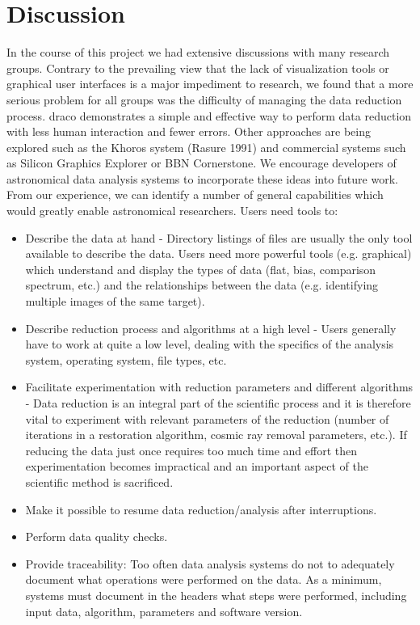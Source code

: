 \section{Discussion}

In the course of this project we had extensive discussions with many 
research groups. Contrary to the prevailing view that the lack of 
visualization tools or graphical user interfaces is a major impediment to 
research, we found that a more serious problem for all groups was the 
difficulty of managing the data reduction process. {\sc draco} demonstrates 
a simple and effective way to perform data reduction with less human 
interaction and fewer errors. Other approaches are being explored such as 
the Khoros system (Rasure 1991) and commercial systems such as Silicon 
Graphics Explorer or BBN Cornerstone. We encourage developers of 
astronomical data analysis systems to incorporate these ideas into 
future work. From our experience, we can identify a number of general 
capabilities which would greatly enable astronomical researchers. Users 
need tools to: 

\begin{itemize} 

\item Describe the data at hand - Directory listings of files are usually 
the only tool available to describe the data. Users need more powerful 
tools (e.g. graphical) which understand and display the types of data (flat, bias, comparison 
spectrum, etc.) and the relationships between the data (e.g. identifying 
multiple images of the same target).

\item Describe reduction process and algorithms at a high level - Users 
generally have to work at quite a low level, dealing with the specifics 
of the analysis system, operating system, file types, etc.

\item Facilitate experimentation with reduction parameters and different 
algorithms - Data reduction is an integral part of the scientific process 
and it is therefore vital to experiment with relevant parameters of the 
reduction (number of iterations in a restoration algorithm, cosmic ray 
removal parameters, etc.). If reducing the data just once requires too 
much time and effort then experimentation becomes impractical and an 
important aspect of the scientific method is sacrificed.

\item Make it possible to resume data reduction/analysis after 
interruptions.

\item Perform data quality checks.

\item Provide traceability: Too often data analysis systems do not to adequately 
document what operations were performed on the data. As a minimum, systems 
must document in the headers what steps were performed, including input 
data, algorithm, parameters and software version. 
\end{itemize} 

